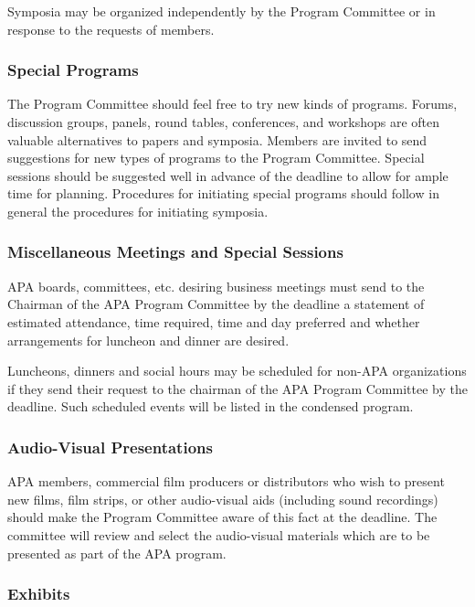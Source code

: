 Symposia may be organized independently by the Program Committee or in response to the requests of members.

\subsubsection{Special Programs}
\label{specialprograms}

The Program Committee should feel free to try new kinds of programs. Forums, discussion groups, panels, round tables, conferences, and workshops are often valuable alternatives to papers and symposia. Members are invited to send suggestions for new types of programs to the Program Committee. Special sessions should be suggested well in advance of the deadline to allow for ample time for planning. Procedures for initiating special programs should follow in general the procedures for initiating symposia.

\subsubsection{Miscellaneous Meetings and Special Sessions}
\label{miscellaneousmeetingsandspecialsessions}

APA boards, committees, etc. desiring business meetings must send to the Chairman of the APA Program Committee by the deadline a statement of estimated attendance, time required, time and day preferred and whether arrangements for luncheon and dinner are desired.

Luncheons, dinners and social hours may be scheduled for non-APA organizations if they send their request to the chairman of the APA Program Committee by the deadline. Such scheduled events will be listed in the condensed program.

\subsubsection{Audio-Visual Presentations}
\label{audio-visualpresentations}

APA members, commercial film producers or distributors who wish to present new films, film strips, or other audio-visual aids (including sound recordings) should make the Program Committee aware of this fact at the deadline. The committee will review and select the audio-visual materials which are to be presented as part of the APA program.

\subsubsection{Exhibits}
\label{exhibits}


